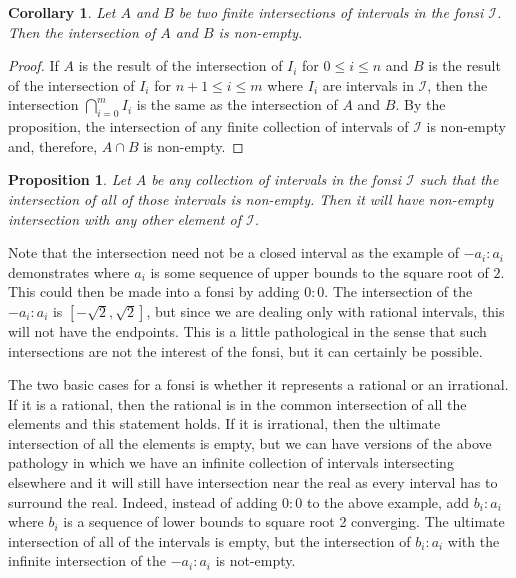 \documentclass[12pt]{article}
\newtheorem{corollary}{Corollary}[subsection]
\newtheorem{proposition}{Proposition}[subsection]
\theoremstyle{remark}
\begin{document}
\begin{corollary}
Let $A$ and $B$ be two finite intersections of intervals in the fonsi $\mathcal{I}$. Then the intersection of $A$ and $B$ is non-empty.
\end{corollary}

\begin{proof}
    If $A$ is the result of the intersection of $I_i$ for $0 \leq i \leq n$ and $B$ is the result of the intersection of $I_i$ for $n+1 \leq i \leq m$ where $I_i$ are intervals in $\mathcal{I}$, then the intersection $\bigcap_{i=0}^m I_i$ is the same as the intersection of $A$ and $B$. By the proposition, the intersection of any finite collection of intervals of $\mathcal{I}$ is non-empty and, therefore, $A \cap B$ is non-empty. 
\end{proof}

\begin{proposition}\label{pr:fonsi-inf-inter}
Let $A$ be any collection of intervals in the fonsi $\mathcal{I}$ such that the intersection of all of those intervals is non-empty. Then it will have non-empty intersection with any other element of $\mathcal{I}$.
\end{proposition}

Note that the intersection need not be a closed interval as the example of $-a_i : a_i$ demonstrates where $a_i$ is some sequence of upper bounds to the square root of $2$. This could then be made into a fonsi by adding $0:0$. The intersection of the $-a_i:a_i$ is $[-\sqrt{2}, \sqrt{2}]$, but since we are dealing only with rational intervals, this will not have the endpoints. This is a little pathological in the sense that such intersections are not the interest of the fonsi, but it can certainly be possible. 

The two basic cases for a fonsi is whether it represents a rational or an irrational. If it is a rational, then the rational is in the common intersection of all the elements and this statement holds. If it is irrational, then the ultimate intersection of all the elements is empty, but we can have versions of the above pathology in which we have an infinite collection of intervals intersecting elsewhere and it will still have intersection near the real as every interval has to surround the real. Indeed, instead of adding $0:0$ to the above example, add $b_i:a_i$ where $b_i$ is a sequence of lower bounds to square root 2 converging. The ultimate intersection of all of the intervals is empty, but the intersection of $b_i:a_i$ with the infinite intersection of the $-a_i:a_i$  is not-empty. 
\end{document}
